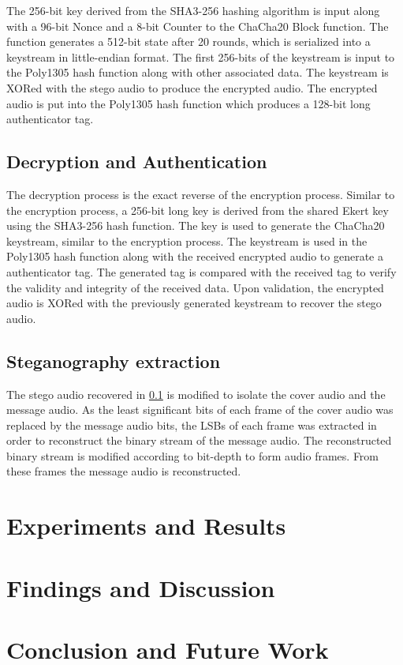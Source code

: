 \documentclass{article}
\begin{document}
The 256-bit key derived from the SHA3-256 hashing algorithm is input along with a 96-bit Nonce and a 8-bit Counter to the ChaCha20 Block function. The function generates a 512-bit state after 20 rounds, which is serialized into a keystream in little-endian format. The first 256-bits of the keystream is input to the Poly1305 hash function along with other associated data. The keystream is XORed with the stego audio to produce the encrypted audio. The encrypted audio is put into the Poly1305 hash function which produces a 128-bit long authenticator tag.
\subsection{Decryption and Authentication}
\label{sec:chacha20poly1305decryption}
The decryption process is the exact reverse of the encryption process. Similar to the encryption process, a 256-bit long key is derived from the shared Ekert key using the SHA3-256 hash function. The key is used to generate the ChaCha20 keystream, similar to the encryption process. The keystream is used in the Poly1305 hash function along with the received encrypted audio to generate a authenticator tag. The generated tag is compared with the received tag to verify the validity and integrity of the received data. Upon validation, the encrypted audio is XORed with the previously generated keystream to recover the stego audio.
\subsection{Steganography extraction}
The stego audio recovered in \ref{sec:chacha20poly1305decryption} is modified to isolate the cover audio and the message audio. As the least significant bits of each frame of the cover audio was replaced by the message audio bits, the LSBs of each frame was extracted in order to reconstruct the binary stream of the message audio. The reconstructed binary stream is modified according to bit-depth to form audio frames. From these frames the message audio is reconstructed.
\section{Experiments and Results}
\label{sec:experminats}
\section{Findings and Discussion}
\label{sec:discussion}
\section{Conclusion and Future Work}
\label{sec:conclusion}



\end{document}
